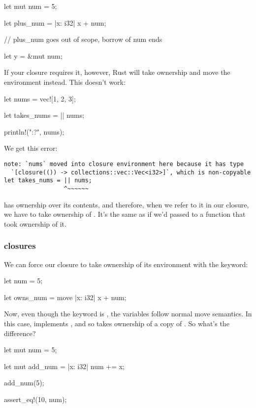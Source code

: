 \begin{rustc}
let mut num = 5;
{
    let plus_num = |x: i32| x + num;

} // plus_num goes out of scope, borrow of num ends

let y = &mut num;
\end{rustc}

If your closure requires it, however, Rust will take ownership and move the environment instead. This doesn't work:

\begin{rustc}
let nums = vec![1, 2, 3];

let takes_nums = || nums;

println!("{:?}", nums);
\end{rustc}

We get this error:

\begin{verbatim}
note: `nums` moved into closure environment here because it has type
  `[closure(()) -> collections::vec::Vec<i32>]`, which is non-copyable
let takes_nums = || nums;
                 ^~~~~~~
\end{verbatim}

 has ownership over its contents, and therefore, when we refer to it in our closure, we have to take ownership of . 
It's the same as if we'd passed  to a function that took ownership of it.

\subsubsection*{ closures}

We can force our closure to take ownership of its environment with the  keyword:

\begin{rustc}
let num = 5;

let owns_num = move |x: i32| x + num;
\end{rustc}

Now, even though the keyword is , the variables follow normal move semantics. In this case,  implements , 
and so  takes ownership of a copy of . So what's the difference?

\begin{rustc}
let mut num = 5;

{
    let mut add_num = |x: i32| num += x;

    add_num(5);
}

assert_eq!(10, num);
\end{rustc}

